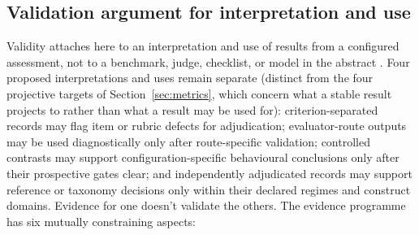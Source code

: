 \subsection{Validation argument for interpretation and use}

Validity attaches here to an interpretation and use of results from a configured assessment, not to a benchmark, judge, checklist, or model in the abstract \citep{messick1995Validity}. Four proposed interpretations and uses remain separate (distinct from the four projective targets of Section~\ref{sec:metrics}, which concern what a stable result projects to rather than what a result may be used for): criterion-separated records may flag item or rubric defects for adjudication; evaluator-route outputs may be used diagnostically only after route-specific validation; controlled contrasts may support configuration-specific behavioural conclusions only after their prospective gates clear; and independently adjudicated records may support reference or taxonomy decisions only within their declared regimes and construct domains. Evidence for one doesn't validate the others. The evidence programme has six mutually constraining aspects:

